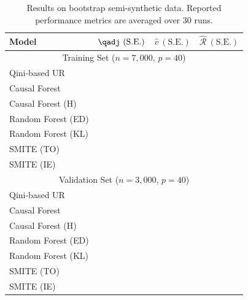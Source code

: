 \begin{table}[H]
    \caption{Results on bootstrap semi-synthetic data. Reported performance metrics are averaged over $30$ runs. }
    \centering
    \begin{tabular}{|p{3.3cm}||p{2.1cm}|p{1.8cm}|p{1.8cm}|}
         \hline
         Model &  $\qadj~(\mathrm{S.E.})$ & $\hat{v}~(\mathrm{S.E.})$ & $\hat{\mathcal{R}}~(\mathrm{S.E.})$\\
         \hline
         \multicolumn{4}{|c|}{Training Set ($n=7,000$, $p=40$)} \\
         \hline
         Qini-based UR  &  & & \\
         Causal Forest  &  & & \\
         Causal Forest (H) &  & & \\
         Random Forest (ED) &  & & \\
         Random Forest (KL) &  & & \\
         SMITE (TO) &  & & \\
         SMITE (IE) &  & & \\
         \hline
         \multicolumn{4}{|c|}{Validation Set ($n=3,000$, $p=40$)} \\
         \hline
         Qini-based UR  &  & & \\
         Causal Forest  &  & & \\
         Causal Forest (H) &  & & \\
         Random Forest (ED) &  & & \\
         Random Forest (KL) &  & & \\
         SMITE (TO) &  & & \\
         SMITE (IE) &  & & \\
         \hline
    \end{tabular}
    \label{tab:boot_perf}
\end{table}